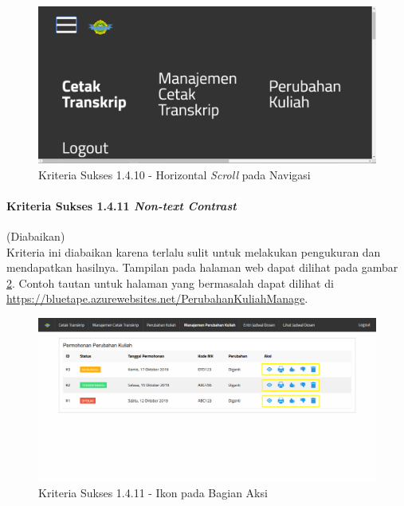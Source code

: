\documentclass[a4paper,twoside]{article}
\begin{document}
\begin{enumerate}
		\begin{figure}[H]
			\centering  
			\includegraphics[scale=0.3, frame]{kriteria-sukses-1-4-10-reflow}  
			\caption[Kriteria Sukses 1.4.10 - Horizontal \textit{Scroll} pada Navigasi]{Kriteria Sukses 1.4.10 - Horizontal \textit{Scroll} pada Navigasi}
			\label{fig:1.4.10_reflow}  
		\end{figure} 

		\paragraph{Kriteria Sukses 1.4.11 \textit{Non-text Contrast}}
		\label{par:kepatuhan_bluetape_kriteria_sukses_1.4.11}
		(Diabaikan)\\

		Kriteria ini diabaikan karena terlalu sulit untuk melakukan pengukuran dan mendapatkan hasilnya. Tampilan pada halaman web dapat dilihat pada gambar \ref{fig:1.4.11_non_text_contrast}. Contoh tautan untuk halaman yang bermasalah dapat dilihat di \url{https://bluetape.azurewebsites.net/PerubahanKuliahManage}.

		\begin{figure}[H]
			\centering  
			\includegraphics[scale=0.3, frame]{kriteria-sukses-1-4-11-non-text-contrast}  
			\caption[Kriteria Sukses 1.4.11 - Ikon pada Bagian Aksi]{Kriteria Sukses 1.4.11 - Ikon pada Bagian Aksi}
			\label{fig:1.4.11_non_text_contrast}  
		\end{figure} 
		

\end{enumerate}
\end{document}
